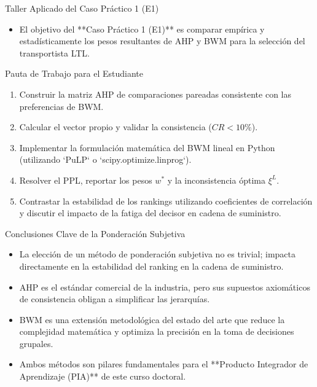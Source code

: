 \documentclass[aspectratio=169, 10pt]{beamer}
\begin{document}
\begin{frame}{Taller Aplicado del Caso Práctico 1 (E1)}
    \begin{itemize}
        \item El objetivo del **Caso Práctico 1 (E1)** es comparar empírica y estadísticamente los pesos resultantes de AHP y BWM para la selección del transportista LTL.
    \end{itemize}
    \begin{block}{Pauta de Trabajo para el Estudiante}
        \begin{enumerate}
            \item Construir la matriz AHP de comparaciones pareadas consistente con las preferencias de BWM.
            \item Calcular el vector propio y validar la consistencia ($CR < 10\%$).
            \item Implementar la formulación matemática del BWM lineal en Python (utilizando `PuLP` o `scipy.optimize.linprog`).
            \item Resolver el PPL, reportar los pesos $w^*$ y la inconsistencia óptima $\xi^L$.
            \item Contrastar la estabilidad de los rankings utilizando coeficientes de correlación y discutir el impacto de la fatiga del decisor en cadena de suministro.
        \end{enumerate}
    \end{block}
\end{frame}

\begin{frame}{Conclusiones Clave de la Ponderación Subjetiva}
    \begin{itemize}
        \item La elección de un método de ponderación subjetiva no es trivial; impacta directamente en la estabilidad del ranking en la cadena de suministro.
        \item AHP es el estándar comercial de la industria, pero sus supuestos axiomáticos de consistencia obligan a simplificar las jerarquías.
        \item BWM es una extensión metodológica del estado del arte que reduce la complejidad matemática y optimiza la precisión en la toma de decisiones grupales.
        \item Ambos métodos son pilares fundamentales para el **Producto Integrador de Aprendizaje (PIA)** de este curso doctoral.
    \end{itemize}
\end{frame}
\end{document}
